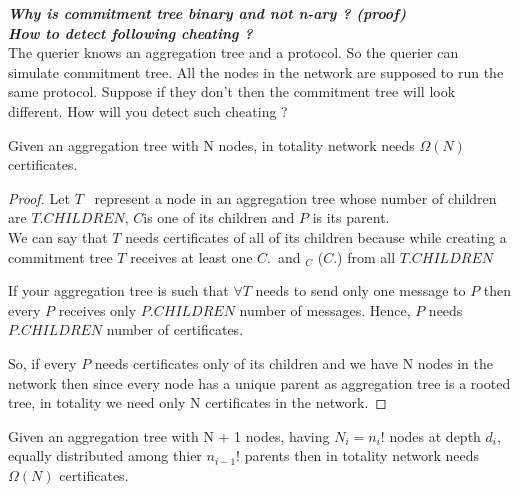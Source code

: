 \textbf{\textit{Why is commitment tree binary and not n-ary ? (proof)}}\\

\textbf{\textit{How to detect following cheating ?}}\\
	The querier knows an aggregation tree and a protocol. So the querier can simulate commitment tree.
	All the nodes in the network are supposed to run the same protocol. Suppose if they don't then the commitment tree will look different. How will you detect such cheating ?

\newpage

\begin{theorem} \label{min certificates}
	Given an aggregation tree with N nodes, in totality network needs $\Omega(N)$ certificates.
\end{theorem}

\begin{proof}
	
	Let $T$ \ represent a node in an aggregation tree whose number of children are $T$.$CHILDREN$, $C$is one of its children and $P$ is its parent.\\
	We can say that $T$ needs certificates of all of its children because while creating a commitment tree $T$ receives at least one $C$.\msg \ and \sign$_{C}$ ($C$.\msg)  from all $T$.$CHILDREN$

	If your aggregation tree is such that $\forall T$ needs to send only one message to $P$ then every $P$ receives only $P.CHILDREN$ number of messages. Hence, $P$ needs $P.CHILDREN$ number of certificates.

	So, if every $P$ needs certificates only of its children  and we have N nodes in the network then since every node has a unique parent as aggregation tree is a rooted tree, in totality we need only N certificates in the network.

\end{proof}


\begin{theorem}
		Given an aggregation tree with N + 1 nodes, having $N_{i} = n_{i}!$ nodes at depth $d_{i}$, equally distributed among thier $n_{i-1}!$ parents then in totality network needs $\Omega(N)$ certificates.
\end{theorem}

